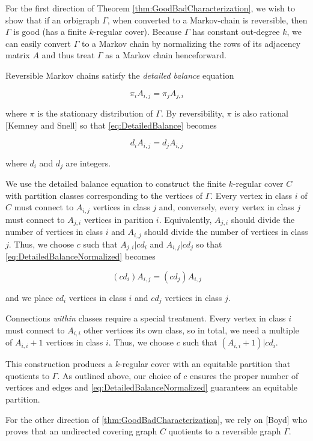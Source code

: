 For the first direction of Theorem \ref{thm:GoodBadCharacterization}, we wish to show that if an orbigraph $\Gamma$, when converted to a Markov-chain is reversible, then $\Gamma$ is good (has a finite $k$-regular cover). Because $\Gamma$ has constant out-degree $k$, we can easily convert $\Gamma$ to a Markov chain by normalizing the rows of its adjacency matrix $A$ and thus treat $\Gamma$ as a Markov chain henceforward.

Reversible Markov chains satisfy the \textit{detailed balance} equation 

\begin{equation}\label{eq:DetailedBalance}
	\pi_i A_{ i, j } = \pi_j A_{ j, i }
\end{equation}

where $\pi$ is the stationary distribution of $\Gamma$. By reversibility, $\pi$ is also rational [Kemney and Snell] so that \ref{eq:DetailedBalance} becomes

\begin{equation} \label{eq:DetailedBalanceNormalized}
	d_i A_{i, j} = d_j A_{ i, j }
\end{equation}

where $d_i$ and $d_j$ are integers.

We use the detailed balance equation to construct the finite $k$-regular cover $C$ with partition classes corresponding to the vertices of $\Gamma$. Every vertex in class $i$ of $C$ must connect to $A_{i, j}$ vertices in class $j$ and, conversely, every vertex in class $j$ must connect to $A_{j, i}$ vertices in parition $i$.  Equivalently, $A_{j, i}$ should divide the number of vertices in class $i$ and $A_{i, j}$ should divide the number of vertices in class $j$. Thus, we choose $c$ such that $A_{j, i} | c d_i$ and $A_{i, j} | c d_j$ so that \ref{eq:DetailedBalanceNormalized} becomes

\begin{equation} \label{eq:DetailedBalanceNormalized}
	(c d_i) A_{ i, j } = (c d_j) A_{ i, j }
\end{equation}

and we place $c d_i$ vertices in class $i$ and $c d_j$ vertices in class $j$.

Connections \textit{within} classes require a special treatment. Every vertex in class $i$ must connect to $A_{i, i}$ other vertices its own class, so in total, we need a multiple of $A_{i, i} + 1$ vertices in class $i$. Thus, we choose $c$ such that $(A_{ i, i } + 1) | c d_i$. 

This construction produces a $k$-regular cover with an equitable partition that quotients to $\Gamma$. As outlined above, our choice of $c$ ensures the proper number of vertices and edges and \ref{eq:DetailedBalanceNormalized} guarantees an equitable partition.

For the other direction of \ref{thm:GoodBadCharacterization}, we rely on [Boyd] who proves that an undirected covering graph $C$ quotients to a reversible graph $\Gamma$. 